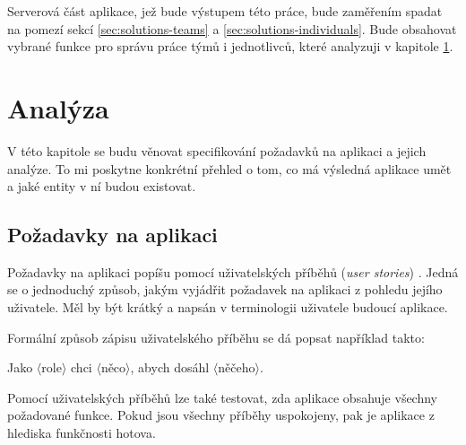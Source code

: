 \documentclass[thesis=B,czech]{FITthesis}[2012/06/26]
\begin{document}
		Serverová část aplikace, jež bude výstupem této práce, bude zaměřením spadat na pomezí sekcí \ref{sec:solutions-teams} a \ref{sec:solutions-individuals}. Bude obsahovat vybrané funkce pro správu práce týmů i jednotlivců, které analyzuji v kapitole \ref{chapter:analysis}.

	
\chapter{Analýza}
	\label{chapter:analysis}
	
	V této kapitole se budu věnovat specifikování požadavků na aplikaci a jejich analýze. To mi poskytne konkrétní přehled o tom, co má výsledná aplikace umět a jaké entity v ní budou existovat.
	
	\section{Požadavky na aplikaci}
		Požadavky na aplikaci popíšu pomocí uživatelských příběhů (\textit{user stories}) \cite{user-stories}. Jedná se o jednoduchý způsob, jakým vyjádřit požadavek na aplikaci z pohledu jejího uživatele. Měl by být krátký a napsán v terminologii uživatele budoucí aplikace.
		
		Formální způsob zápisu uživatelského příběhu se dá popsat například takto: \cite{user-stories-applied-book}
		\begin{center}
			Jako $\langle$role$\rangle$ chci $\langle$něco$\rangle$, abych dosáhl $\langle$něčeho$\rangle$.
		\end{center}
		Pomocí uživatelských příběhů lze také testovat, zda aplikace obsahuje všechny požadované funkce. Pokud jsou všechny příběhy uspokojeny, pak je aplikace z hlediska funkčnosti hotova.
		
\end{document}

